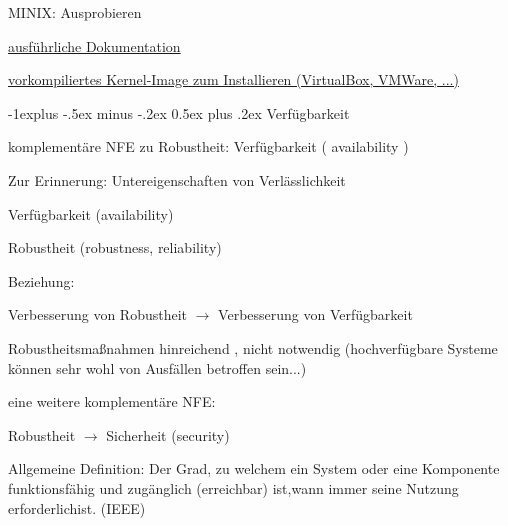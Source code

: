 \documentclass[a4paper]{article}
\makeatletter
\renewcommand{\subsection}{\@startsection{subsection}{2}{0mm}%
 {-1explus -.5ex minus -.2ex}%
 {0.5ex plus .2ex}%
 {\normalfont\normalsize\bfseries}}
\makeatother
\begin{document}
\begin{multicols}{3}
    MINIX: Ausprobieren

    \begin{itemize*}
        \item
        \href{https://wiki.minix3.org/doku.php?id=www:getting-started:start}{ausführliche
            Dokumentation}
        \item
        \href{https://wiki.minix3.org/doku.php?id=www:download:start}{vorkompiliertes
            Kernel-Image zum Installieren (VirtualBox, VMWare, ...)}
    \end{itemize*}


    \subsection{Verfügbarkeit}

    \begin{itemize*}
        \item
        komplementäre NFE zu Robustheit: Verfügbarkeit ( availability )
        \begin{itemize*}
            \item Zur Erinnerung: Untereigenschaften von Verlässlichkeit
        \end{itemize*}
        \begin{enumerate*}

            \item Verfügbarkeit (availability)
            \item Robustheit (robustness, reliability)
        \end{enumerate*}
        \item
        Beziehung:
        \begin{itemize*}
            \item Verbesserung von Robustheit $\rightarrow$ Verbesserung von Verfügbarkeit
            \item Robustheitsmaßnahmen hinreichend , nicht notwendig (hochverfügbare Systeme können sehr wohl von Ausfällen betroffen sein...)
        \end{itemize*}
        \item
        eine weitere komplementäre NFE:
        \begin{itemize*}
            \item Robustheit $\rightarrow$ Sicherheit (security)
        \end{itemize*}
    \end{itemize*}

    Allgemeine Definition: Der Grad, zu welchem ein System oder eine
    Komponente funktionsfähig und zugänglich (erreichbar) ist,wann immer
    seine Nutzung erforderlichist. (IEEE)


\end{multicols}
\end{document}
